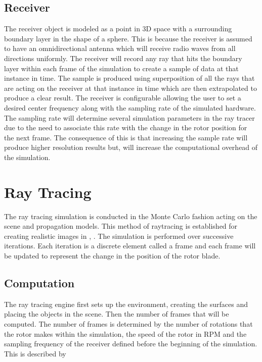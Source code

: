 \subsection{Receiver}
The receiver object is modeled as a point in 3D space with a surrounding boundary layer in the shape of a sphere. This is because the receiver is assumed to have an omnidirectional antenna which will receive radio waves from all directions uniformly. The receiver will record any ray that hits the boundary layer within each frame of the simulation to create a sample of data at that instance in time.
The sample is produced using superposition of all the rays that are acting on the receiver at that instance in time which are then extrapolated to produce a clear result.
The receiver is configurable allowing the user to set a desired center frequency along with the sampling rate of the simulated hardware. The sampling rate will determine several simulation parameters in the ray tracer due to the need to associate this rate with the change in the rotor position for the next frame. The consequence of this is that increasing the sample rate will produce higher resolution results but, will increase the computational overhead of the simulation.

\section{Ray Tracing}
The ray tracing simulation is conducted in the Monte Carlo fashion acting on the scene and propagation models. This method of raytracing is established for creating realistic images in \cite{Suffern2007}, \cite{Pharr2010}. The simulation is performed over successive iterations. Each iteration is a discrete element called a frame and each frame will be updated to represent the change in the position of the rotor blade.

\subsection{Computation}
The ray tracing engine first sets up the environment, creating the surfaces and placing the objects in the scene. Then the number of frames that will be computed. The number of frames is determined by the number of rotations that the rotor makes within the simulation, the speed of the rotor in RPM and the sampling frequency of the receiver defined before the beginning of the simulation. This is described by

